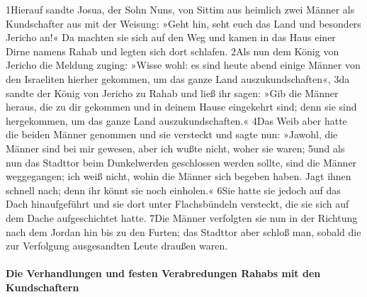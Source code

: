 1Hierauf sandte Josua, der Sohn Nuns, von Sittim aus heimlich zwei
Männer als Kundschafter aus mit der Weisung: »Geht hin, seht euch das
Land und besonders Jericho an!« Da machten sie sich auf den Weg und
kamen in das Haus einer Dirne namens Rahab und legten sich dort
schlafen. 2Als nun dem König von Jericho die Meldung zuging: »Wisse
wohl: es sind heute abend einige Männer von den Israeliten hierher
gekommen, um das ganze Land auszukundschaften«, 3da sandte der König von
Jericho zu Rahab und ließ ihr sagen: »Gib die Männer heraus, die zu dir
gekommen und in deinem Hause eingekehrt sind; denn sie sind hergekommen,
um das ganze Land auszukundschaften.« 4Das Weib aber hatte die beiden
Männer genommen und sie versteckt und sagte nun: »Jawohl, die Männer
sind bei mir gewesen, aber ich wußte nicht, woher sie waren; 5und als
nun das Stadttor beim Dunkelwerden geschlossen werden sollte, sind die
Männer weggegangen; ich weiß nicht, wohin die Männer sich begeben haben.
Jagt ihnen schnell nach; denn ihr könnt sie noch einholen.« 6Sie hatte
sie jedoch auf das Dach hinaufgeführt und sie dort unter Flachsbündeln
versteckt, die sie sich auf dem Dache aufgeschichtet hatte. 7Die Männer
verfolgten sie nun in der Richtung nach dem Jordan hin bis zu den
Furten; das Stadttor aber schloß man, sobald die zur Verfolgung
ausgesandten Leute draußen waren.

\hypertarget{die-verhandlungen-und-festen-verabredungen-rahabs-mit-den-kundschaftern}{%
\paragraph{Die Verhandlungen und festen Verabredungen Rahabs mit den
Kundschaftern}\label{die-verhandlungen-und-festen-verabredungen-rahabs-mit-den-kundschaftern}}

